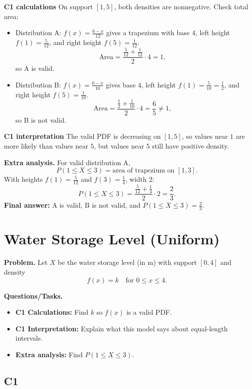 	\textbf{C1 calculations}
	On support $[1,5]$, both densities are nonnegative. Check total area:
	\begin{itemize}
		\item Distribution A: $f(x)=\frac{6-x}{12}$ gives a trapezium with base $4$, left height $f(1)=\frac{5}{12}$, and right height $f(5)=\frac{1}{12}$.
		\[
		\text{Area}=\frac{\frac{5}{12}+\frac{1}{12}}{2}\cdot 4=1,
		\]
		so A is valid.
		\item Distribution B: $f(x)=\frac{6-x}{10}$ gives base $4$, left height $f(1)=\frac{5}{10}=\frac12$, and right height $f(5)=\frac{1}{10}$.
		\[
		\text{Area}=\frac{\frac12+\frac{1}{10}}{2}\cdot 4=\frac65\ne1,
		\]
		so B is not valid.
	\end{itemize}
	
	\textbf{C1 interpretation}
	The valid PDF is decreasing on $[1,5]$, so values near $1$ are more likely than values near $5$, but values near $5$ still have positive density.
	
	\textbf{Extra analysis.}
	For valid distribution A,
	\[
	P(1\le X\le3)=\text{area of trapezium on }[1,3].
	\]
	With heights $f(1)=\frac{5}{12}$ and $f(3)=\frac14$, width $2$:
	\[
	P(1\le X\le3)=\frac{\frac{5}{12}+\frac14}{2}\cdot 2=\frac23.
	\]
	\textbf{Final answer:} A is valid, B is not valid, and $P(1\le X\le3)=\frac23$.

	\section{Water Storage Level (Uniform)}
	
	\textbf{Problem.}
	Let $X$ be the water storage level (in m) with support $[0,4]$ and density
	\[
	f(x)=k\quad\text{for }0\le x\le 4.
	\]
	
	\textbf{Questions/Tasks.}
	\begin{itemize}
		\item \textbf{C1 Calculations:} Find $k$ so $f(x)$ is a valid PDF.
		\item \textbf{C1 Interpretation:} Explain what this model says about equal-length intervals.
		\item \textbf{Extra analysis:} Find $P(1\le X\le 3)$.
	\end{itemize}

	\subsection*{C1}

